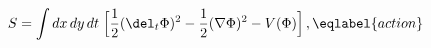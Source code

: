 \begin{equation}
S = \int dx\, dy\, dt\; \Bigl[ {\frac12}(\del_t \Phi)^2 - 
{\frac12}(\nabla\Phi)^2 - V(\Phi) \Bigr] \,,
\eqlabel{action}
\end{equation}

